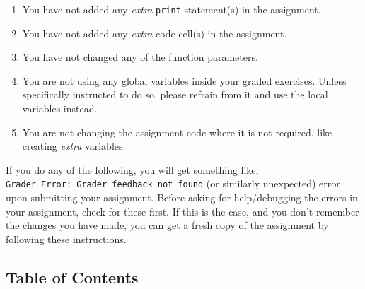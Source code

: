 \documentclass[11pt]{article}
\providecommand{\tightlist}{%
      \setlength{\itemsep}{0pt}\setlength{\parskip}{0pt}}
\begin{document}
\begin{enumerate}
\def\labelenumi{\arabic{enumi}.}
\tightlist
\item
  You have not added any \emph{extra} \texttt{print} statement(s) in the
  assignment.
\item
  You have not added any \emph{extra} code cell(s) in the assignment.
\item
  You have not changed any of the function parameters.
\item
  You are not using any global variables inside your graded exercises.
  Unless specifically instructed to do so, please refrain from it and
  use the local variables instead.
\item
  You are not changing the assignment code where it is not required,
  like creating \emph{extra} variables.
\end{enumerate}

If you do any of the following, you will get something like,
\texttt{Grader\ Error:\ Grader\ feedback\ not\ found} (or similarly
unexpected) error upon submitting your assignment. Before asking for
help/debugging the errors in your assignment, check for these first. If
this is the case, and you don't remember the changes you have made, you
can get a fresh copy of the assignment by following these
\href{https://www.coursera.org/learn/deep-neural-network/supplement/QWEnZ/h-ow-to-refresh-your-workspace}{instructions}.

    \hypertarget{table-of-contents}{%
\subsection{Table of Contents}\label{table-of-contents}}
\end{document}
